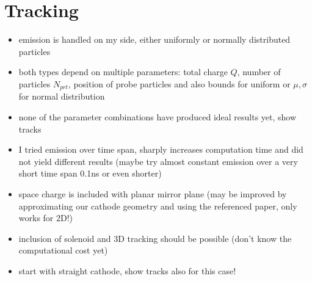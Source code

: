 \section{Tracking}
\begin{itemize}
  \item emission is handled on my side, either uniformly or normally distributed particles
  \item both types depend on multiple parameters: total charge $Q$, number of particles $N_{prt}$, position of probe particles and also bounds for uniform or $\mu, \sigma$ for normal distribution
  \item none of the parameter combinations have produced ideal results yet, show tracks
  \item I tried emission over time span, sharply increases computation time and did not yield different results (maybe try almost constant emission over a very short time span 0.1ns or even shorter)
  \item space charge is included with planar mirror plane (may be improved by approximating our cathode geometry and using the referenced paper, only works for 2D!)
  \item inclusion of solenoid and 3D tracking should be possible (don't know the computational cost yet)
  \item start with straight cathode, show tracks also for this case!
\end{itemize}

\begin{center}
\begin{figure}
  
\end{figure}
\end{center}
